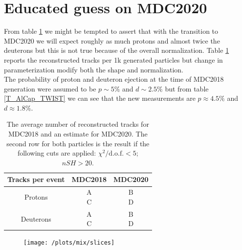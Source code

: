\documentclass[12pt,a4paper,openright, oneside, titlepage]{book} %
\begin{document}
\section{Educated guess on MDC2020}
From table \ref{T_syst} we might be tempted to assert that with the transition to MDC2020 we will expect roughly as much protons and almost twice the deuterons but this is not true because of the overall normalization. 
Table \ref{T_syst} reports the reconstructed tracks per 1k generated particles but change in parameterization modify both the shape and normalization.\\
The probability of proton and deuteron ejection at the time of MDC2018 generation were assumed to be $p\sim5\%$ and $d\sim2.5\%$ but from table \ref{T_AlCap_TWIST} we can see that the new measurements are $p\approx4.5\%$ and $d\approx1.8\%$.

\begin{table}
\centering
\begin{tabular}{|c|c|c|}
\hline
Tracks per event& MDC2018 & MDC2020 \\
\hline
\hline
Protons& 
\makecell{A \\ C} & 
\makecell{ B \\ D} \\
\hline
Deuterons & 
\makecell{A \\ C} & 
\makecell{ B \\ D} \\
\hline
\end{tabular}
\caption[Educated guess on MDC2020 yields]{The average number of reconstructed tracks for MDC2018 and an estimate for MDC2020.
The second row for both particles is the result if the following cuts are applied: $\chi^2/\textrm{d.o.f.}<5$; $nSH>20$.}
\label{T_syst}
\end{table}


\begin{figure}
\centering
\texttt{[image: /plots/mix/slices]}
\caption[\ ]
{}
\label{_slices}
\end{figure}
\end{document}
